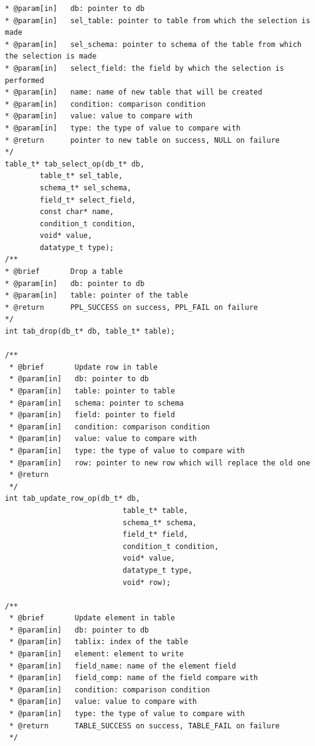 \documentclass[12pt,onecolumn]{article}
\begin{document}
\begin{lstlisting}[style=C]
* @param[in]   db: pointer to db
* @param[in]   sel_table: pointer to table from which the selection is made
* @param[in]   sel_schema: pointer to schema of the table from which the selection is made
* @param[in]   select_field: the field by which the selection is performed
* @param[in]   name: name of new table that will be created
* @param[in]   condition: comparison condition
* @param[in]   value: value to compare with
* @param[in]   type: the type of value to compare with
* @return      pointer to new table on success, NULL on failure
*/
table_t* tab_select_op(db_t* db,
        table_t* sel_table,
        schema_t* sel_schema,
        field_t* select_field,
        const char* name,
        condition_t condition,
        void* value,
        datatype_t type);
/**
* @brief       Drop a table
* @param[in]   db: pointer to db
* @param[in]   table: pointer of the table
* @return      PPL_SUCCESS on success, PPL_FAIL on failure
*/
int tab_drop(db_t* db, table_t* table);

/**
 * @brief       Update row in table
 * @param[in]   db: pointer to db
 * @param[in]   table: pointer to table 
 * @param[in]   schema: pointer to schema 
 * @param[in]   field: pointer to field 
 * @param[in]   condition: comparison condition
 * @param[in]   value: value to compare with
 * @param[in]   type: the type of value to compare with 
 * @param[in]   row: pointer to new row which will replace the old one
 * @return 
 */
int tab_update_row_op(db_t* db,
                           table_t* table,
                           schema_t* schema,
                           field_t* field,
                           condition_t condition,
                           void* value,
                           datatype_t type,
                           void* row);

/**
 * @brief       Update element in table
 * @param[in]   db: pointer to db
 * @param[in]   tablix: index of the table
 * @param[in]   element: element to write
 * @param[in]   field_name: name of the element field
 * @param[in]   field_comp: name of the field compare with
 * @param[in]   condition: comparison condition
 * @param[in]   value: value to compare with
 * @param[in]   type: the type of value to compare with
 * @return      TABLE_SUCCESS on success, TABLE_FAIL on failure
 */


\end{lstlisting}
\end{document}
